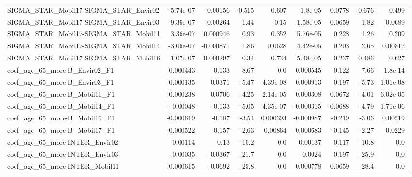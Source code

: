 \begin{tabular}{lrrrrrrrr}
SIGMA\_STAR\_Mobil17-SIGMA\_STAR\_Envir02     &   -5.74e-07 &     -0.00156 &  -0.515 &    0.607 &    1.8e-05 &      0.0778 &       -0.676 &         0.499 \\
SIGMA\_STAR\_Mobil17-SIGMA\_STAR\_Envir03     &   -9.36e-07 &     -0.00264 &    1.44 &     0.15 &   1.58e-05 &      0.0659 &         1.82 &        0.0689 \\
SIGMA\_STAR\_Mobil17-SIGMA\_STAR\_Mobil11     &    3.36e-07 &     0.000946 &    0.93 &    0.352 &   5.76e-05 &       0.228 &         1.26 &         0.209 \\
SIGMA\_STAR\_Mobil17-SIGMA\_STAR\_Mobil14     &   -3.06e-07 &    -0.000871 &    1.86 &   0.0628 &   4.42e-05 &       0.203 &         2.65 &       0.00812 \\
SIGMA\_STAR\_Mobil17-SIGMA\_STAR\_Mobil16     &    1.07e-07 &     0.000297 &    0.34 &    0.734 &   5.48e-05 &       0.237 &        0.486 &         0.627 \\
coef\_age\_65\_more-B\_Envir02\_F1             &    0.000443 &        0.133 &    8.67 &      0.0 &   0.000545 &       0.122 &         7.66 &       1.8e-14 \\
coef\_age\_65\_more-B\_Envir03\_F1             &   -0.000135 &      -0.0371 &   -5.47 & 4.39e-08 &   0.000913 &       0.197 &        -5.73 &      1.01e-08 \\
coef\_age\_65\_more-B\_Mobil11\_F1             &   -0.000238 &      -0.0706 &   -4.25 & 2.14e-05 &   0.000308 &      0.0672 &        -4.01 &      6.02e-05 \\
coef\_age\_65\_more-B\_Mobil14\_F1             &    -0.00048 &       -0.133 &   -5.05 & 4.35e-07 &  -0.000315 &     -0.0688 &        -4.79 &      1.71e-06 \\
coef\_age\_65\_more-B\_Mobil16\_F1             &   -0.000619 &       -0.187 &   -3.54 & 0.000393 &  -0.000987 &      -0.219 &        -3.06 &       0.00219 \\
coef\_age\_65\_more-B\_Mobil17\_F1             &   -0.000522 &       -0.157 &   -2.63 &  0.00864 &  -0.000683 &      -0.145 &        -2.27 &        0.0229 \\
coef\_age\_65\_more-INTER\_Envir02            &     0.00114 &         0.13 &   -10.2 &      0.0 &    0.00137 &       0.117 &        -10.8 &           0.0 \\
coef\_age\_65\_more-INTER\_Envir03            &    -0.00035 &      -0.0367 &   -21.7 &      0.0 &     0.0024 &       0.197 &        -25.9 &           0.0 \\
coef\_age\_65\_more-INTER\_Mobil11            &   -0.000615 &      -0.0692 &   -25.8 &      0.0 &   0.000778 &      0.0659 &        -28.4 &           0.0 \\

\end{tabular}

